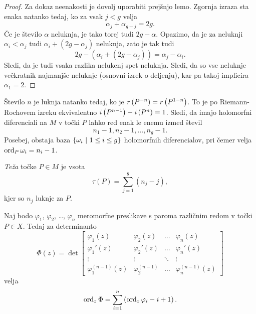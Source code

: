 \begin{proof}
Za dokaz neenakosti je dovolj uporabiti prejšnjo lemo. Zgornja
izraza sta enaka natanko tedaj, ko za vsak $j < g$ velja
\[
\alpha_j + \alpha_{g-j} = 2g.
\]
Če je število $\alpha$ neluknja, je tako torej tudi $2g - \alpha$.
Opazimo, da je za neluknji $\alpha_i < \alpha_j$ tudi
$\alpha_i + (2g - \alpha_j)$ neluknja, zato je tak tudi
\[
2g - (\alpha_i + (2g - \alpha_j)) = \alpha_j - \alpha_i.
\]
Sledi, da je tudi vsaka razlika nelukenj spet neluknja. Sledi, da
so vse neluknje večkratnik najmanjše neluknje (osnovni izrek o
deljenju), kar pa takoj implicira $\alpha_1 = 2$.
\end{proof}

Število $n$ je luknja natanko tedaj, ko je
$r \left(P^{-n}\right) = r \left(P^{1-n}\right)$. To je po Riemann-Rochovem izreku
ekvivalentno $i \left(P^{n-1}\right) - i \left(P^n\right) = 1$. Sledi, da imajo
holomorfni diferenciali na $M$ v točki $P$ lahko red enak le enemu
izmed števil
\[
n_1 - 1, n_2 - 1, \dots, n_g - 1.
\]
Posebej, obstaja baza $\left\{\omega_i~\middle\vert~1 \leq i \leq g\right\}$
holomorfnih diferencialov, pri čemer velja
$\operatorname{ord}_P \omega_i = n_i - 1$.

\begin{definicija}
\emph{Teža} točke $P \in M$ je vsota
\[
\tau(P) = \sum_{j=1}^g (n_j - j),
\]
kjer so $n_j$ luknje za $P$.
\end{definicija}

\begin{lema}
Naj bodo $\varphi_1$, $\varphi_2$, \dots, $\varphi_n$ meromorfne
preslikave s paroma različnim redom v točki $P \in X$. Tedaj za
determinanto
\[
\Phi(z) = \det
\begin{bmatrix}
\varphi_1(z)    & \varphi_2(z)  & \dots  & \varphi_n(z)  \\
\varphi_1'(z)   & \varphi_2'(z) & \dots  & \varphi_n'(z) \\
\vdots          & \vdots        & \ddots & \vdots        \\
\varphi_1^{(n-1)}(z)            & \varphi_2^{(n-1)}      &
\dots                           & \varphi_n^{(n-1)}(z)
\end{bmatrix}
\]
velja
\[
\operatorname{ord}_z \Phi = \sum_{i=1}^n \left(\operatorname{ord}_z \varphi_i - i + 1\right).
\]
\end{lema}

